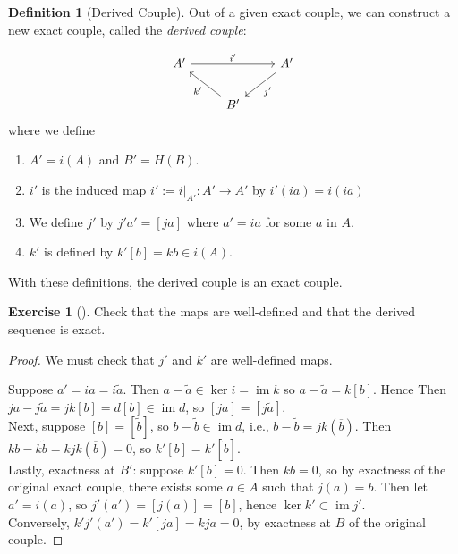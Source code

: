 \documentclass[reqno]{amsart}
\theoremstyle{definition}
\newtheorem{definition}[theorem]{Definition}
\newtheorem{exercise}[theorem]{Exercise}
\theoremstyle{remark}
\DeclareMathOperator{\im}{im}
\begin{document}
\begin{definition}[Derived Couple]
    Out of a given exact couple, we can construct
    a new exact couple, called the \textit{derived couple}:

    \begin{equation*}
    \begin{tikzcd}
        A' \ar[rr, "i'"] & & A' \ar[dl, "j'"] \\
                       & B' \ar[ul, "k'"] &
    \end{tikzcd}
    \end{equation*}
    where we define
    \begin{enumerate}
        \item $A' = i(A)$ and $B' = H(B)$.
        \item $i'$ is the induced
            map $i' := i|_{A'} \colon
            A'\to A'$ by $i' (ia) = i(ia)$ 
        \item We define $j'$ by
            $j' a' = \left[ ja \right] $ where
            $a' = ia$ for some $a$ in $A$.
        \item $k'$ is defined by
            $k' \left[ b \right] = kb \in i(A)$.
    \end{enumerate}
    With these definitions, the derived couple is an exact
    couple.
\end{definition}

\begin{exercise}[]
    Check that the maps are well-defined and that the
    derived sequence is exact.
\end{exercise}

\begin{proof}
    We must check that $j'$ and $k'$ are well-defined maps.

    Suppose $a' = ia = i \tilde{a}$.
    Then $a-\tilde{a} \in \ker i = \im k$ so
    $a - \tilde{a} = k\left[ b \right] $. Hence
    Then
    $j a - j \tilde{a} =
    j k \left[ b \right] 
    = d \left[ b \right] \in \im d$, so
    $\left[ j a \right] =
    \left[ j \tilde{a} \right] $.\\
    Next, suppose
    $\left[ b \right] = \left[ \tilde{b} \right] $, so
    $b - \tilde{b}\in 
    \im d$, i.e., $b - \tilde{b} = 
    jk (\overline{b})$.
    Then
    $k b - k \tilde{b} = 
    kjk (\overline{b}) = 
    0$, so
    $k' \left[ b \right] =
    k'\left[ \tilde{b} \right] $.\\
    \linebreak
    Lastly, exactness at $B'$:
     suppose $k' \left[ b \right] = 0$. Then
     $kb = 0$, so by exactness of the original exact
     couple, there exists some $a \in A$ such that
     $j (a) = b$. Then
     let $a' = i(a)$, so
     $j' (a') = \left[ j (a) \right] =
     \left[ b \right] $, hence
     $\ker k' \subset \im j'$.\\
     Conversely, 
     $k' j' (a') =
     k' \left[ ja \right] =
     kja = 0$, by exactness at
     $B$ of the original couple.
\end{proof}
\end{document}
